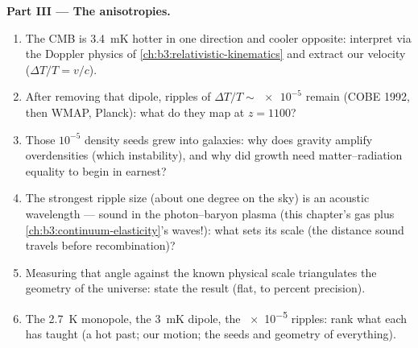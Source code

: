 \begin{problem}
\medskip\noindent\textbf{Part III --- The anisotropies.}
\begin{enumerate}[resume]
  \item The CMB is \qty{3.4}{mK} hotter in one direction and
        cooler opposite: interpret via the Doppler physics of
        \cref{ch:b3:relativistic-kinematics} and extract our
        velocity ($\Delta T/T = v/c$).
  \item After removing that dipole, ripples of $\Delta T/T \sim
        \num{e-5}$ remain (COBE 1992, then WMAP, Planck): what do
        they map at $z = 1100$?
  \item Those $10^{-5}$ density seeds grew into galaxies: why
        does gravity amplify overdensities (which instability),
        and why did growth need matter--radiation equality to
        begin in earnest?
  \item The strongest ripple size (about one degree on the sky)
        is an acoustic wavelength --- sound in the
        photon--baryon plasma (this chapter's gas plus
        \cref{ch:b3:continuum-elasticity}'s waves!): what sets
        its scale (the distance sound travels before
        recombination)?
  \item Measuring that angle against the known physical scale
        triangulates the geometry of the universe: state the
        result (flat, to percent precision).
  \item The \qty{2.7}{K} monopole, the \qty{3}{mK} dipole, the
        \num{e-5} ripples: rank what each has taught (a hot past;
        our motion; the seeds and geometry of everything).
\end{enumerate}


\end{problem}
